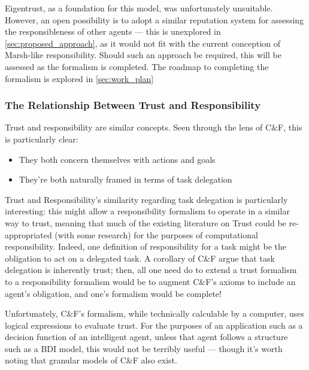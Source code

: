 Eigentrust, as a foundation for this model, was unfortunately unsuitable. However, an open possibility is to adopt a similar reputation system for assessing the responsibleness of other agents --- this is unexplored in \cref{sec:proposed_approach}, as it would not fit with the current conception of Marsh-like responsibility. Should such an approach be required, this will be assessed as the formalism is completed. The roadmap to completing the formalism is explored in \cref{sec:work_plan}


\subsubsection{The Relationship Between Trust and Responsibility}
Trust and responsibility are similar concepts. Seen through the lens of C\&F, this is particularly clear: 

\begin{itemize}
    \item They both concern themselves with actions and goals
    \item They're both naturally framed in terms of task delegation
\end{itemize}

Trust and Responsibility's similarity regarding task delegation is particularly interesting: this might allow a responsibility formalism to operate in a similar way to trust, meaning that much of the existing literature on Trust could be re-appropriated (with some research) for the purposes of computational responsibility. Indeed, one definition of responsibility for a task might be the obligation to act on a delegated task. A corollary of C\&F argue that task delegation is inherently trust; then, all one need do to extend a trust formalism to a responsibility formalism would be to augment C\&F's axioms to include an agent's obligation, and one's formalism would be complete!\par

Unfortunately, C\&F's formalism, while technically calculable by a computer, uses logical expressions to evaluate trust. For the purposes of an application such as a decision function of an intelligent agent, unless that agent follows a structure such as a BDI model, this would not be terribly useful --- though it's worth noting that granular models of C\&F also exist\cite{lorini2008binary}.
